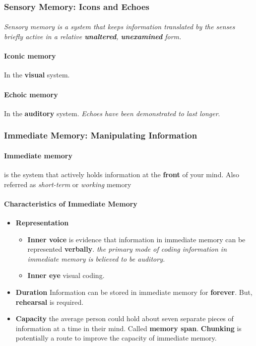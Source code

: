 \documentclass{article}
\begin{document}
	\subsubsection{Sensory Memory: Icons and Echoes}
	\paragraph{} \emph{Sensory memory is a system that keeps information translated by the senses briefly active in a relative \textbf{unaltered}, \textbf{unexamined} form.}
	\paragraph{Iconic memory} In the \textbf{visual} system.
	\paragraph{Echoic memory} In the \textbf{auditory} system. \emph{Echoes have been demonstrated to last longer}.
	\subsubsection{Immediate Memory: Manipulating Information}
	\paragraph{Immediate memory} is the system that actively holds information at the \textbf{front} of your mind. Also referred as \emph{short-term} or \emph{working} memory
	\paragraph{Characteristics of Immediate Memory}
	\begin{itemize}
		\item \textbf{Representation}
		\begin{itemize}
			\item \textbf{Inner voice} is evidence that information in immediate memory can be represented \textbf{verbally}. \emph{the primary mode of coding information in immediate memory is believed to be auditory.}
			\item \textbf{Inner eye} visual coding.
		\end{itemize}
		\item \textbf{Duration} Information can be stored in immediate memory for \textbf{forever}. But, \textbf{rehearsal} is required.
		\item \textbf{Capacity} the average person could hold about seven separate pieces of information at a time in their mind. Called \textbf{memory span}. \textbf{Chunking} is potentially a route to improve the capacity of immediate memory.
	\end{itemize}
	
\end{document}
